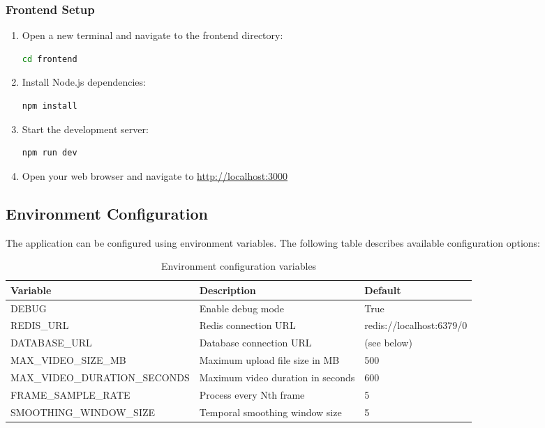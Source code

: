 \subsubsection{Frontend Setup}

\begin{enumerate}
    \item Open a new terminal and navigate to the frontend directory:
\begin{lstlisting}[language=bash, caption={Navigate to frontend}]
cd frontend
\end{lstlisting}

    \item Install Node.js dependencies:
\begin{lstlisting}[language=bash, caption={Install npm dependencies}]
npm install
\end{lstlisting}

    \item Start the development server:
\begin{lstlisting}[language=bash, caption={Start frontend development server}]
npm run dev
\end{lstlisting}

    \item Open your web browser and navigate to \url{http://localhost:3000}
\end{enumerate}

\subsection{Environment Configuration}

The application can be configured using environment variables. The following table describes available configuration options:

\begin{table}[H]
\centering
\footnotesize
\begin{tabularx}{\textwidth}{|l|X|l|}
\hline
\textbf{Variable} & \textbf{Description} & \textbf{Default} \\
\hline
DEBUG & Enable debug mode & True \\
\hline
REDIS\_URL & Redis connection URL & redis://localhost:6379/0 \\
\hline
DATABASE\_URL & Database connection URL & (see below) \\
\hline
MAX\_VIDEO\_SIZE\_MB & Maximum upload file size in MB & 500 \\
\hline
MAX\_VIDEO\_DURATION\_SECONDS & Maximum video duration in seconds & 600 \\
\hline
FRAME\_SAMPLE\_RATE & Process every Nth frame & 5 \\
\hline
SMOOTHING\_WINDOW\_SIZE & Temporal smoothing window size & 5 \\
\hline
\end{tabularx}
\caption{Environment configuration variables}
\label{tab:env-config}
\end{table}

